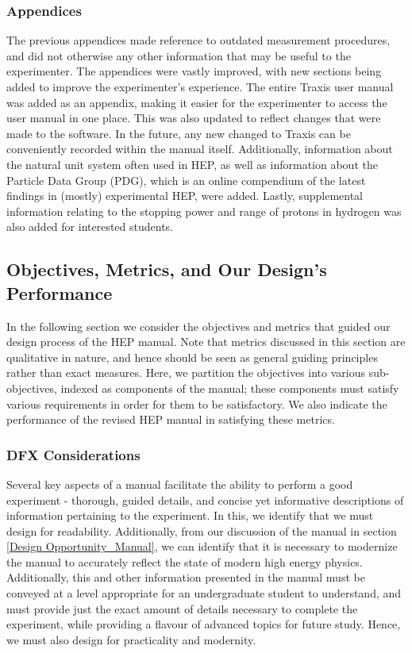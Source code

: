 \documentclass[12pt]{article} %
\begin{document}
\subsubsection{Appendices}\label{sec:updated_manual_appendices}
The previous appendices made reference to outdated measurement procedures, and did not otherwise any other information that may be useful to the experimenter. The appendices were vastly improved, with new sections being added to improve the experimenter's experience. The entire Traxis user manual was added as an appendix, making it easier for the experimenter to access the user manual in one place. This was also updated to reflect changes that were made to the software. In the future, any new changed to Traxis can be conveniently recorded within the manual itself. Additionally, information about the natural unit system often used in HEP, as well as information about the Particle Data Group (PDG), which is an online compendium of the latest findings in (mostly) experimental HEP, were added. Lastly, supplemental information relating to the stopping power and range of protons in hydrogen was also added for interested students.

\subsection{Objectives, Metrics, and Our Design’s Performance  }
In the following section we consider the objectives and metrics that guided our design process of the HEP manual. Note that metrics discussed in this section are qualitative in nature, and hence should be seen as general guiding principles rather than exact measures. Here, we partition the objectives into various sub-objectives, indexed as components of the manual; these components must satisfy various requirements in order for them to be satisfactory. We also indicate the performance of the revised HEP manual in satisfying these metrics.

\subsubsection{DFX Considerations}
Several key aspects of a manual facilitate the ability to perform a good experiment - thorough, guided details, and concise yet informative descriptions of information pertaining to the experiment. In this, we identify that we must design for readability. Additionally, from our discussion of the manual in section \ref{Design Opportunity_Manual}, we can identify that it is necessary to modernize the manual to accurately reflect the state of modern high energy physics. Additionally, this and other information presented in the manual must be conveyed at a level appropriate for an undergraduate student to understand, and must provide just the exact amount of details necessary to complete the experiment, while providing a flavour of advanced topics for future study. Hence, we must also design for practicality and modernity.
\end{document}
